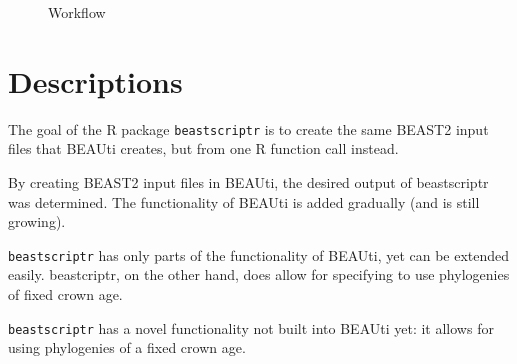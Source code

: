 \documentclass{article}
\begin{document}
\begin{figure}

  \caption{
    Workflow
  }
  \label{fig:beauti}
\end{figure}

\section{Descriptions}

The goal of the R package \verb;beastscriptr; is to create the 
same BEAST2 input files that BEAUti creates, but from one R function call 
instead.

By creating BEAST2 input files in BEAUti, 
the desired output of beastscriptr was determined. 
The functionality of BEAUti is added gradually (and is still growing).

\verb;beastscriptr; has only parts of the functionality of BEAUti, yet
can be extended easily. beastcriptr, on the other hand, does allow for specifying
to use phylogenies of fixed crown age.

\verb;beastscriptr; has a novel functionality not built into BEAUti yet:
it allows for using phylogenies of a fixed crown age. 
\end{document}
